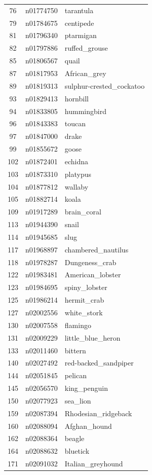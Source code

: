 \begin{table}
\begin{tabular}{cll}
76 & n01774750 & tarantula \\
79 & n01784675 & centipede \\
81 & n01796340 & ptarmigan \\
82 & n01797886 & ruffed_grouse \\
85 & n01806567 & quail \\
87 & n01817953 & African_grey \\
89 & n01819313 & sulphur-crested_cockatoo \\
93 & n01829413 & hornbill \\
94 & n01833805 & hummingbird \\
96 & n01843383 & toucan \\
97 & n01847000 & drake \\
99 & n01855672 & goose \\
102 & n01872401 & echidna \\
103 & n01873310 & platypus \\
104 & n01877812 & wallaby \\
105 & n01882714 & koala \\
109 & n01917289 & brain_coral \\
113 & n01944390 & snail \\
114 & n01945685 & slug \\
117 & n01968897 & chambered_nautilus \\
118 & n01978287 & Dungeness_crab \\
122 & n01983481 & American_lobster \\
123 & n01984695 & spiny_lobster \\
125 & n01986214 & hermit_crab \\
127 & n02002556 & white_stork \\
130 & n02007558 & flamingo \\
131 & n02009229 & little_blue_heron \\
133 & n02011460 & bittern \\
140 & n02027492 & red-backed_sandpiper \\
144 & n02051845 & pelican \\
145 & n02056570 & king_penguin \\
150 & n02077923 & sea_lion \\
159 & n02087394 & Rhodesian_ridgeback \\
160 & n02088094 & Afghan_hound \\
162 & n02088364 & beagle \\
164 & n02088632 & bluetick \\
171 & n02091032 & Italian_greyhound \\

\end{tabular}
\end{table}
